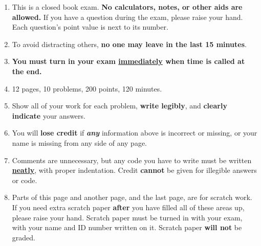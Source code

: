 \documentclass[11pt]{article}
\begin{document}
  \begin{enumerate}

    \addtolength{\itemsep}{-2mm}  %

    \item This is a closed book exam.  \textbf{No calculators, notes, or
          other aids are allowed.}  If you have a question during the exam,
          please raise your hand.  Each question's point value is next to
          its number.

    \item To avoid distracting others, \textbf{no one may leave in the
          last 15 minutes}.

    \item \textbf{You must turn in your exam \underline{immediately} when
          time is called at the end.}

    \item 12 pages, 10 problems, 200 points, 120 minutes.

    \item Show all of your work for each problem, \textbf{write legibly},
          and \textbf{clearly indicate} your answers.

    \item You will \textbf{lose credit} if \emph{\textbf{any}} information
          above is incorrect or missing, or your name is missing from any
          side of any page.

    \item \label{code-style} Comments are unnecessary, but any code you have
          to write must be written \textbf{\underline{neatly}}, with proper
          indentation.  Credit \textbf{cannot} be given for illegible
          answers or code.

    \item Parts of this page and another page, and the last page, are for
          scratch work.  If you need extra scratch paper \textbf{after} you
          have filled all of these areas up, please raise your hand.
          Scratch paper must be turned in with your exam, with your name and
          ID number written on it.  Scratch paper \textbf{will not} be
          graded.



\end{enumerate}
\end{document}
